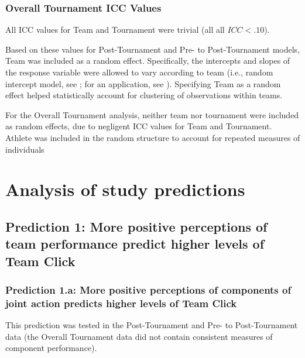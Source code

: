 \begin{CJK}{UTF8}{gbsn}
\subsubsection{Overall Tournament ICC Values}

All ICC values for Team and Tournament were trivial (all all $ICC < .10$).

Based on these values for Post-Tournament and Pre- to Post-Tournament models,  Team was included as a random effect. Specifically, the intercepts and slopes of the response variable were allowed to vary according to team (i.e., random intercept model, see \citep{Pinheiro2000}; for an application, see \citep{Oberauer2006}). Specifying Team as a random effect helped statistically account for clustering of observations within teams.

For the Overall Tournament analysis, neither team nor tournament were included as random effects, due to negligent ICC values for Team and Tournament.  Athlete was included in the random structure to account for repeated measures of individuals















\clearpage




\section{Analysis of study predictions}


\subsection{Prediction 1: More positive perceptions of team performance predict higher levels of Team Click}


\subsubsection{Prediction 1.a: More positive perceptions of components of joint action predicts higher levels of Team Click}

This prediction was tested in the Post-Tournament and Pre- to Post-Tournament data (the Overall Tournament data did not contain consistent measures of component performance).



\end{CJK}
